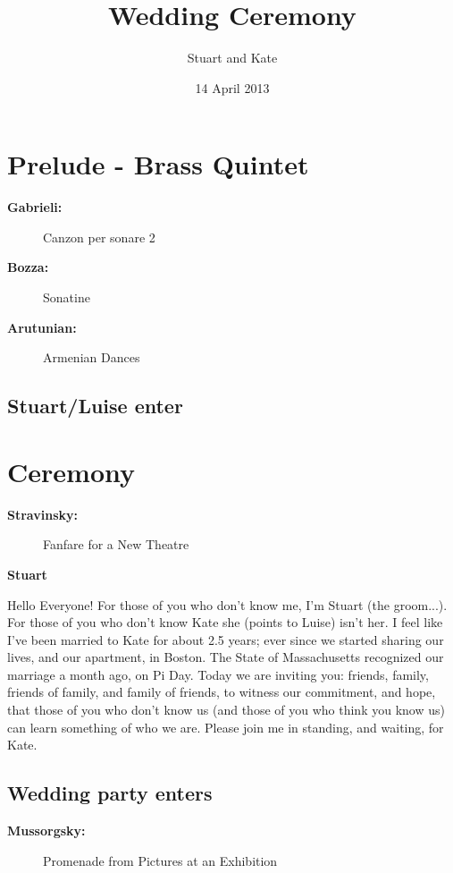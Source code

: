 \documentclass[twoside]{article}
\author{Stuart and Kate}
\title{Wedding Ceremony}
\date{14 April 2013}
\begin{document}
  \maketitle
  
  \section{Prelude - Brass Quintet}
    \begin{description}
      \item[\textbf{Gabrieli:}] Canzon per sonare 2
      \item[\textbf{Bozza:}] Sonatine
      \item[\textbf{Arutunian:}] Armenian Dances
    \end{description}
    \subsection{Stuart/Luise enter}
    
  \section{Ceremony}
    \begin{description}
      \item[\textbf{Stravinsky:}] Fanfare for a New Theatre
    \end{description}
  
  	\begin{center}
      \textbf{Stuart}
    \end{center}
Hello Everyone! For those of you who don’t know me, I’m Stuart (the groom...). For those of you who don’t know Kate she (points to Luise) isn’t her. I feel like I’ve been married to Kate for about 2.5 years; ever since we started sharing our lives, and our apartment, in Boston. The State of Massachusetts recognized our marriage a month ago, on Pi Day. Today we are inviting you: friends, family, friends of family, and family of friends, to witness our commitment, and hope, that those of you who don’t know us (and those of you who think you know us) can learn something of who we are. Please join me in standing, and waiting, for Kate.
		
    \subsection{Wedding party enters}
      \begin{description}
        \item[\textbf{Mussorgsky:}] Promenade from Pictures at an Exhibition
      \end{description}
  		
\end{document}
